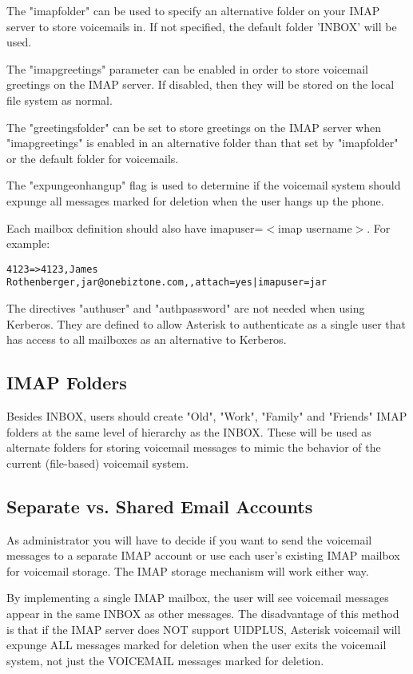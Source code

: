 The "imapfolder" can be used to specify an alternative folder on your IMAP server
to store voicemails in. If not specified, the default folder 'INBOX' will be used.

The "imapgreetings" parameter can be enabled in order to store voicemail greetings
on the IMAP server. If disabled, then they will be stored on the local file system
as normal.

The "greetingsfolder" can be set to store greetings on the IMAP server when
"imapgreetings" is enabled in an alternative folder than that set by "imapfolder"
or the default folder for voicemails.

The "expungeonhangup" flag is used to determine if the voicemail system should
expunge all messages marked for deletion when the user hangs up the phone.

Each mailbox definition should also have imapuser=$<$imap username$>$.
For example:
\begin{astlisting}
\begin{verbatim}
4123=>4123,James Rothenberger,jar@onebiztone.com,,attach=yes|imapuser=jar
\end{verbatim}
\end{astlisting}

The directives "authuser" and "authpassword" are not needed when using
Kerberos. They are defined to allow Asterisk to authenticate as a single
user that has access to all mailboxes as an alternative to Kerberos.


\subsection{IMAP Folders}

Besides INBOX, users should create "Old", "Work", "Family" and "Friends"
IMAP folders at the same level of hierarchy as the INBOX.  These will be
used as alternate folders for storing voicemail messages to mimic the
behavior of the current (file-based) voicemail system.


\subsection{Separate vs. Shared Email Accounts}

As administrator you will have to decide if you want to send the voicemail
messages to a separate IMAP account or use each user's existing IMAP mailbox
for voicemail storage.  The IMAP storage mechanism will work either way.

By implementing a single IMAP mailbox, the user will see voicemail messages
appear in the same INBOX as other messages.  The disadvantage of this method
is that if the IMAP server does NOT support UIDPLUS, Asterisk voicemail will
expunge ALL messages marked for deletion when the user exits the voicemail
system, not just the VOICEMAIL messages marked for deletion.

